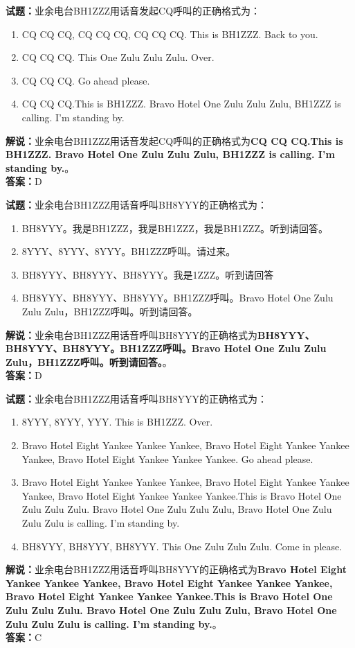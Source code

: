\documentclass{ctexbook}
\begin{document}
\noindent\textbf{试题：}业余电台BH1ZZZ用话音发起CQ呼叫的正确格式为：
\begin{enumerate}[leftmargin=3em]
\item CQ CQ CQ, CQ CQ CQ, CQ CQ CQ. This is BH1ZZZ. Back to you.
\item CQ CQ CQ. This One Zulu Zulu Zulu. Over.
\item CQ CQ CQ. Go ahead please.
\item CQ CQ CQ.This is BH1ZZZ. Bravo Hotel One Zulu Zulu Zulu, BH1ZZZ is calling. I’m standing by.
\end{enumerate}
\noindent\textbf{解说：}业余电台BH1ZZZ用话音发起CQ呼叫的正确格式为\textbf{CQ CQ CQ.This is BH1ZZZ. Bravo Hotel One Zulu Zulu Zulu, BH1ZZZ is calling. I’m standing by.}。\\\noindent\textbf{答案：}D



\bigskip


\noindent\textbf{试题：}业余电台BH1ZZZ用话音呼叫BH8YYY的正确格式为：
\begin{enumerate}[leftmargin=3em]
\item BH8YYY。我是BH1ZZZ，我是BH1ZZZ，我是BH1ZZZ。听到请回答。
\item 8YYY、8YYY、8YYY。BH1ZZZ呼叫。请过来。
\item BH8YYY、BH8YYY、BH8YYY。我是1ZZZ。听到请回答
\item BH8YYY、BH8YYY、BH8YYY。BH1ZZZ呼叫。Bravo Hotel One Zulu Zulu Zulu，BH1ZZZ呼叫。听到请回答。
\end{enumerate}
\noindent\textbf{解说：}业余电台BH1ZZZ用话音呼叫BH8YYY的正确格式为\textbf{BH8YYY、BH8YYY、BH8YYY。BH1ZZZ呼叫。Bravo Hotel One Zulu Zulu Zulu，BH1ZZZ呼叫。听到请回答。}。\\\noindent\textbf{答案：}D


\bigskip


\noindent\textbf{试题：}业余电台BH1ZZZ用话音呼叫BH8YYY的正确格式为：
\begin{enumerate}[leftmargin=3em]
\item 8YYY, 8YYY, YYY. This is BH1ZZZ. Over.
\item Bravo Hotel Eight Yankee Yankee Yankee, Bravo Hotel Eight Yankee Yankee Yankee, Bravo Hotel Eight Yankee Yankee Yankee. Go ahead please.
\item Bravo Hotel Eight Yankee Yankee Yankee, Bravo Hotel Eight Yankee Yankee Yankee, Bravo Hotel Eight Yankee Yankee Yankee.This is Bravo Hotel One Zulu Zulu Zulu. Bravo Hotel One Zulu Zulu Zulu, Bravo Hotel One Zulu Zulu Zulu is calling. I’m standing by.
\item BH8YYY, BH8YYY, BH8YYY. This One Zulu Zulu Zulu. Come in please.
\end{enumerate}
\noindent\textbf{解说：}业余电台BH1ZZZ用话音呼叫BH8YYY的正确格式为\textbf{Bravo Hotel Eight Yankee Yankee Yankee, Bravo Hotel Eight Yankee Yankee Yankee, Bravo Hotel Eight Yankee Yankee Yankee.This is Bravo Hotel One Zulu Zulu Zulu. Bravo Hotel One Zulu Zulu Zulu, Bravo Hotel One Zulu Zulu Zulu is calling. I’m standing by.}。\\\noindent\textbf{答案：}C
\end{document}
